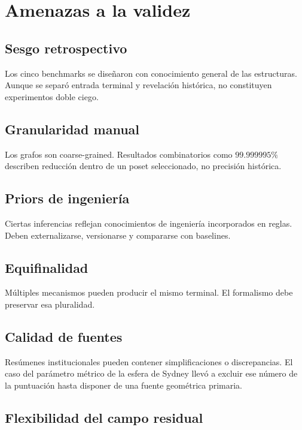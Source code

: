 \section{Amenazas a la validez}

\subsection{Sesgo retrospectivo}

Los cinco benchmarks se diseñaron con conocimiento general de las estructuras. Aunque se separó entrada terminal y revelación histórica, no constituyen experimentos doble ciego.

\subsection{Granularidad manual}

Los grafos son coarse-grained. Resultados combinatorios como \(99.999995\%\) describen reducción dentro de un poset seleccionado, no precisión histórica.

\subsection{Priors de ingeniería}

Ciertas inferencias reflejan conocimientos de ingeniería incorporados en reglas. Deben externalizarse, versionarse y compararse con baselines.

\subsection{Equifinalidad}

Múltiples mecanismos pueden producir el mismo terminal. El formalismo debe preservar esa pluralidad.

\subsection{Calidad de fuentes}

Resúmenes institucionales pueden contener simplificaciones o discrepancias. El caso del parámetro métrico de la esfera de Sydney llevó a excluir ese número de la puntuación hasta disponer de una fuente geométrica primaria.

\subsection{Flexibilidad del campo residual}

